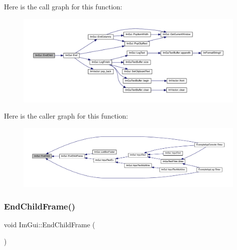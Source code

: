 Here is the call graph for this function\+:
\nopagebreak
\begin{figure}[H]
\begin{center}
\leavevmode
\includegraphics[width=350pt]{namespace_im_gui_af8de559a88c1442d6df8c1b04c86e997_cgraph}
\end{center}
\end{figure}
Here is the caller graph for this function\+:
\nopagebreak
\begin{figure}[H]
\begin{center}
\leavevmode
\includegraphics[width=350pt]{namespace_im_gui_af8de559a88c1442d6df8c1b04c86e997_icgraph}
\end{center}
\end{figure}
\mbox{\label{namespace_im_gui_ac4bd9024554b5074805bc0ce3076c514}} 
\subsubsection{\texorpdfstring{End\+Child\+Frame()}{EndChildFrame()}}
{\footnotesize\ttfamily void Im\+Gui\+::\+End\+Child\+Frame (\begin{DoxyParamCaption}{ }\end{DoxyParamCaption})}

